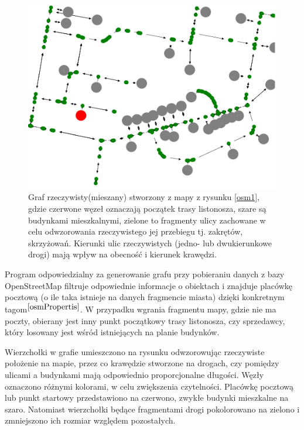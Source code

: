 \documentclass[a4paper, 12pt, twoside, openright]{article}
\begin{document}
\captionsetup{justification=centering}
\begin{figure}[htb]
	\centering
	\includegraphics[width=1\textwidth]{img/grafRzecz/osm1Graf}
	\caption[]{Graf rzeczywisty(mieszany) stworzony z mapy z rysunku \ref{osm1}, gdzie czerwone węzeł oznaczają początek trasy listonosza, szare są budynkami mieszkalnymi, zielone to fragmenty ulicy zachowane w celu odwzorowania rzeczywistego jej przebiegu tj. zakrętów, skrzyżowań. Kierunki ulic rzeczywistych (jedno- lub dwukierunkowe drogi) mają wpływ na obecność i kierunek krawędzi.}
	\label{osm1G}
\end{figure}

Program odpowiedzialny za generowanie grafu przy pobieraniu danych z bazy OpenStreetMap filtruje odpowiednie informacje o obiektach i znajduje placówkę pocztową (o ile taka istnieje na danych fragmencie miasta) dzięki konkretnym tagom$^{\cite{osmPropertis}}$. W przypadku wgrania fragmentu mapy, gdzie nie ma poczty, obierany jest inny punkt początkowy trasy listonosza, czy sprzedawcy, który losowany jest wśród istniejących na planie budynków.

Wierzchołki w grafie umieszczono na rysunku odwzorowując rzeczywiste położenie na mapie, przez co krawędzie stworzone na drogach, czy pomiędzy ulicami a budynkami mają odpowiednio proporcjonalne długości. Węzły oznaczono różnymi kolorami, w celu zwiększenia czytelności. Placówkę pocztową lub punkt startowy przedstawiono na czerwono, zwykłe budynki mieszkalne na szaro. Natomiast wierzchołki będące fragmentami drogi pokolorowano na zielono i zmniejszono ich rozmiar względem pozostałych.
\end{document}
